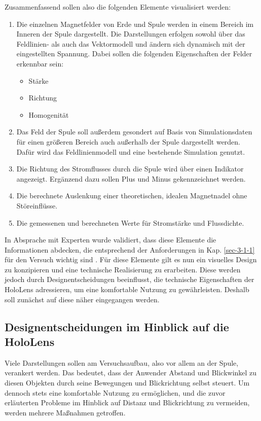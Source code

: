 Zusammenfassend sollen also die folgenden Elemente visualisiert werden:
\begin{enumerate}
	\item Die einzelnen Magnetfelder von Erde und Spule werden in einem Bereich im Inneren der Spule dargestellt. Die Darstellungen erfolgen sowohl über das Feldlinien- als auch das Vektormodell und ändern sich dynamisch mit der eingestellten Spannung. Dabei sollen die folgenden Eigenschaften der Felder erkennbar sein:
	\begin{itemize}[topsep=-0.25em]
		\setlength{\itemsep}{-0.25em}
		\item Stärke
		\item Richtung
		\item Homogenität
	\end{itemize}
	\item Das Feld der Spule soll außerdem gesondert auf Basis von Simulationsdaten für einen größeren Bereich auch außerhalb der Spule dargestellt werden. Dafür wird das Feldlinienmodell und eine bestehende Simulation genutzt.
	\item Die Richtung des Stromflusses durch die Spule wird über einen Indikator angezeigt. Ergänzend dazu sollen Plus und Minus gekennzeichnet werden.
	\item Die berechnete Auslenkung einer theoretischen, idealen Magnetnadel ohne Störeinflüsse. 
	\item Die gemessenen und berechneten Werte für Stromstärke und Flussdichte.
\end{enumerate}
\vspace{6px}

In Absprache mit Experten wurde validiert, dass diese Elemente die Informationen abdecken, die entsprechend der Anforderungen in Kap. \ref{sec-3-1-1} für den Versuch wichtig sind \cite{Reinholz18}. Für diese Elemente gilt es nun ein visuelles Design zu konzipieren und eine technische Realisierung zu erarbeiten. Diese werden jedoch durch Designentscheidungen beeinflusst, die technische Eigenschaften der HoloLens adressieren, um eine komfortable Nutzung zu gewährleisten. Deshalb soll zunächst auf diese näher eingegangen werden.

\subsection{Designentscheidungen im Hinblick auf die HoloLens}
\label{sec-4-3}
Viele Darstellungen sollen am Versuchsaufbau, also vor allem an der Spule, verankert werden. Das bedeutet, dass der Anwender Abstand und Blickwinkel zu diesen Objekten durch seine Bewegungen und Blickrichtung selbst steuert. Um dennoch stets eine komfortable Nutzung zu ermöglichen, und die zuvor erläuterten Probleme im Hinblick auf Distanz und Blickrichtung zu vermeiden, werden mehrere Maßnahmen getroffen.\\

